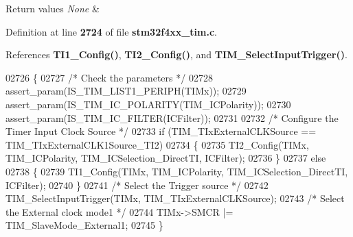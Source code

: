 \begin{DoxyRetVals}{Return values}
{\em None} & \\
\hline
\end{DoxyRetVals}


Definition at line \textbf{ 2724} of file \textbf{ stm32f4xx\+\_\+tim.\+c}.



References \textbf{ T\+I1\+\_\+\+Config()}, \textbf{ T\+I2\+\_\+\+Config()}, and \textbf{ T\+I\+M\+\_\+\+Select\+Input\+Trigger()}.


\begin{DoxyCode}
02726 \{
02727   \textcolor{comment}{/* Check the parameters */}
02728   assert_param(IS_TIM_LIST1_PERIPH(TIMx));
02729   assert_param(IS_TIM_IC_POLARITY(TIM\_ICPolarity));
02730   assert_param(IS_TIM_IC_FILTER(ICFilter));
02731 
02732   \textcolor{comment}{/* Configure the Timer Input Clock Source */}
02733   \textcolor{keywordflow}{if} (TIM\_TIxExternalCLKSource == TIM_TIxExternalCLK1Source_TI2)
02734   \{
02735     TI2_Config(TIMx, TIM\_ICPolarity, TIM_ICSelection_DirectTI, ICFilter);
02736   \}
02737   \textcolor{keywordflow}{else}
02738   \{
02739     TI1_Config(TIMx, TIM\_ICPolarity, TIM_ICSelection_DirectTI, ICFilter);
02740   \}
02741   \textcolor{comment}{/* Select the Trigger source */}
02742   TIM_SelectInputTrigger(TIMx, TIM\_TIxExternalCLKSource);
02743   \textcolor{comment}{/* Select the External clock mode1 */}
02744   TIMx->SMCR |= TIM_SlaveMode_External1;
02745 \}
\end{DoxyCode}
